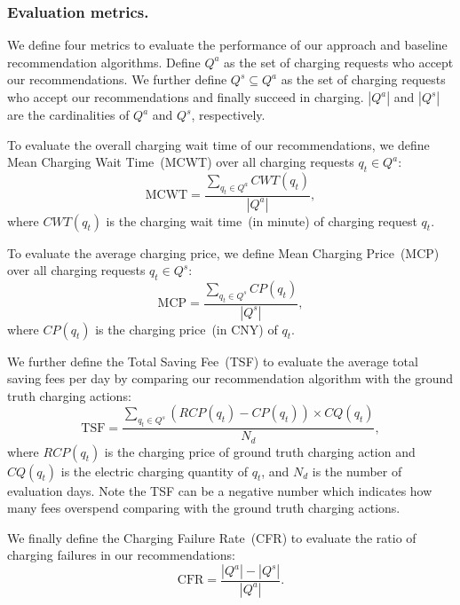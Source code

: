 \documentclass[sigconf]{acmart}
\begin{document}
\subsubsection{Evaluation metrics.}
We define four metrics to evaluate the performance of our approach and baseline recommendation algorithms.
Define $Q^a$ as the set of charging requests who accept our recommendations. We further define $Q^s \subseteq Q^a$ as the set of charging requests who accept our recommendations and finally succeed in charging. $|Q^a|$ and $|Q^s|$ are the cardinalities of $Q^a$ and $Q^s$, respectively.

To evaluate the overall charging wait time of our recommendations, we define Mean Charging Wait Time~(MCWT) over all charging requests $q_t\in Q^a$:
$$
\text{MCWT} = \frac{\sum_{q_t \in Q^a}CWT(q_t)}{|Q^a|},
$$
where $CWT(q_t)$ is the charging wait time~(in minute) of charging request $q_t$. 

To evaluate the average charging price, we define Mean Charging Price~(MCP) over all charging requests $q_t\in Q^s$:
$$
\text{MCP} = \frac{\sum_{q_t \in Q^s}CP(q_t)}{|Q^s|},
$$
where $CP(q_t)$ is the charging price~(in CNY) of $q_t$. 

We further define the Total Saving Fee~(TSF) to evaluate the average total saving fees per day by comparing our recommendation algorithm with the ground truth charging actions:
$$
\text{TSF} = \frac{\sum_{q_t \in Q^s}\left(RCP(q_t)-CP(q_t)\right) \times CQ(q_t)}{N_d},
$$
where $RCP(q_t)$ is the charging price of ground truth charging action and $CQ(q_t)$ is the electric charging quantity of $q_t$, and $N_d$ is the number of evaluation days. Note the TSF can be a negative number which indicates how many fees overspend comparing with the ground truth charging actions.

We finally define the Charging Failure Rate~(CFR) to evaluate the ratio of charging failures in our recommendations:
$$
\text{CFR} = \frac{|Q^a|-|Q^s|}{|Q^a|}.
$$
\end{document}
